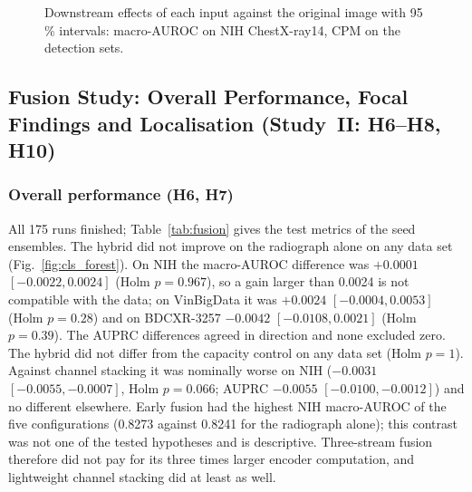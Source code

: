\begin{table}[!t]
\centering
\caption{Downstream models. Top: classification on NIH ChestX-ray14, macro-AUROC of the three-seed ensemble, per-seed mean $\pm$ SD and
the difference to the original image (patient-cluster bootstrap). Bottom: detection on Node21, TBX11K and VinBigData, CPM and mAP@50 (mean
$\pm$ SD over three seeds), differences to the original image and the difference in differences (DiD) of recall at two false positives per
image between bone-overlapping and other lesions (image bootstrap). ``Original + ours + bone'': the original, soft-tissue and bone images
as three channels.}
\label{tab:downstream}
\end{table}

\begin{figure}[!t]
\centering
{}
\caption{Downstream effects of each input against the original image with 95\,\% intervals: macro-AUROC on NIH ChestX-ray14, CPM on the
detection sets.}
\label{fig:downstream_forest}
\end{figure}

\subsection{Fusion Study: Overall Performance, Focal Findings and Localisation (Study~II: H6--H8, H10)}
\label{sec:res-fusion}

\subsubsection{Overall performance (H6, H7)}
All 175 runs finished; Table~\ref{tab:fusion} gives the test metrics of the seed ensembles. The hybrid did not improve on the radiograph
alone on any data set (Fig.~\ref{fig:cls_forest}). On NIH the macro-AUROC difference was $+0.0001$ $[-0.0022,0.0024]$ (Holm $p=0.967$), so
a gain larger than 0.0024 is not compatible with the data; on VinBigData it was $+0.0024$ $[-0.0004,0.0053]$ (Holm $p=0.28$) and on
BDCXR-3257 $-0.0042$ $[-0.0108,0.0021]$ (Holm $p=0.39$). The AUPRC differences agreed in direction and none excluded zero. The hybrid did not
differ from the capacity control on any data set (Holm $p=1$). Against channel stacking it was nominally worse on NIH ($-0.0031$
$[-0.0055,-0.0007]$, Holm $p=0.066$; AUPRC $-0.0055$ $[-0.0100,-0.0012]$) and no different elsewhere. Early fusion had the highest NIH
macro-AUROC of the five configurations (0.8273 against 0.8241 for the radiograph alone); this contrast was not one of the tested
hypotheses and is descriptive. Three-stream fusion therefore did not pay for its three times larger encoder computation, and lightweight
channel stacking did at least as well.

